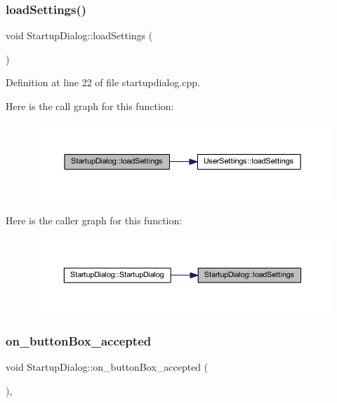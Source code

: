 \subsubsection{\texorpdfstring{loadSettings()}{loadSettings()}}
{\footnotesize\ttfamily void Startup\+Dialog\+::load\+Settings (\begin{DoxyParamCaption}{ }\end{DoxyParamCaption})\hspace{0.3cm}{\ttfamily [private]}}



Definition at line 22 of file startupdialog.\+cpp.

Here is the call graph for this function\+:
\nopagebreak
\begin{figure}[H]
\begin{center}
\leavevmode
\includegraphics[width=350pt]{class_startup_dialog_a931800d2e42ff7172a2245252f04c622_cgraph}
\end{center}
\end{figure}
Here is the caller graph for this function\+:
\nopagebreak
\begin{figure}[H]
\begin{center}
\leavevmode
\includegraphics[width=350pt]{class_startup_dialog_a931800d2e42ff7172a2245252f04c622_icgraph}
\end{center}
\end{figure}
\mbox{\label{class_startup_dialog_acf772dfd42cfc24f058372cb6ee3ae24}} 
\subsubsection{\texorpdfstring{on\_buttonBox\_accepted}{on\_buttonBox\_accepted}}
{\footnotesize\ttfamily void Startup\+Dialog\+::on\+\_\+button\+Box\+\_\+accepted (\begin{DoxyParamCaption}{ }\end{DoxyParamCaption})\hspace{0.3cm}{\ttfamily [private]}, {\ttfamily [slot]}}




